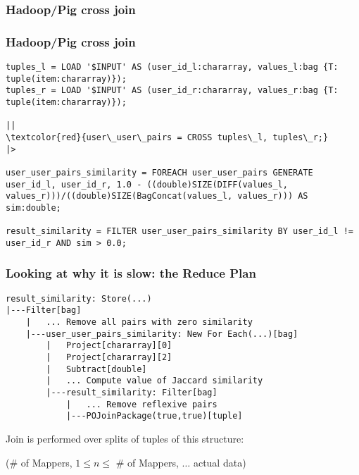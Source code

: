 \documentclass[handout]{beamer}
\begin{document}
\subsubsection{Hadoop/Pig cross join}


\begin{frame}[fragile]
\frametitle{\bf Hadoop/Pig cross join}

\begin{lstlisting}
tuples_l = LOAD '$INPUT' AS (user_id_l:chararray, values_l:bag {T: tuple(item:chararray)});
tuples_r = LOAD '$INPUT' AS (user_id_r:chararray, values_r:bag {T: tuple(item:chararray)});

||
\textcolor{red}{user\_user\_pairs = CROSS tuples\_l, tuples\_r;}
|>

user_user_pairs_similarity = FOREACH user_user_pairs GENERATE user_id_l, user_id_r, 1.0 - ((double)SIZE(DIFF(values_l, values_r)))/((double)SIZE(BagConcat(values_l, values_r))) AS sim:double;

result_similarity = FILTER user_user_pairs_similarity BY user_id_l != user_id_r AND sim > 0.0;
\end{lstlisting}


\end{frame}


\begin{frame}[fragile]
\frametitle{\bf Looking at why it is slow: the Reduce Plan}

\begin{verbatim}
result_similarity: Store(...)
|---Filter[bag]
    |   ... Remove all pairs with zero similarity
    |---user_user_pairs_similarity: New For Each(...)[bag]
        |   Project[chararray][0]
        |   Project[chararray][2]
        |   Subtract[double]
        |   ... Compute value of Jaccard similarity
        |---result_similarity: Filter[bag]
            |   ... Remove reflexive pairs
            |---POJoinPackage(true,true)[tuple]
\end{verbatim}

Join is performed over splits of tuples of this structure:

(\# of Mappers, $1 \leq n \leq $ \# of Mappers, $\ldots$ actual data)


\end{frame}
\end{document}
